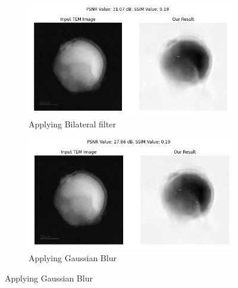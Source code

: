 \begin{figure}[H]
    \centering
    \begin{subfigure}{.47\textwidth} %
        \includegraphics[width=\textwidth]{img/Results/Dataset_1/Dataset_1_Bila_filter.jpg}
        \caption{Applying Bilateral filter}
        \label{fig:Image1}
    \end{subfigure}
    \hfill
    \begin{subfigure}{.47\textwidth} %
        \includegraphics[width=\textwidth]{img/Results/Dataset_1/Dataset_1_gaussian_blur.jpg}
        \caption{Applying Gaussian Blur}
        \label{fig:Image2}
    \end{subfigure}
    
    \vspace{15pt} %
    

\end{figure}
